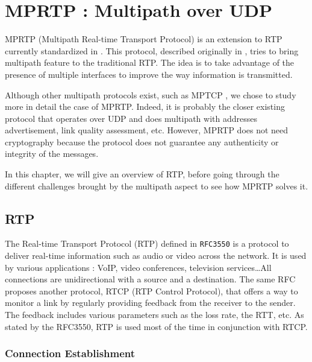 \chapter{MPRTP : Multipath over UDP}
\label{chap:mprtp}

MPRTP (Multipath Real-time Transport Protocol) is an extension to RTP currently standardized in \cite{singh-avtcore-mprtp}. This protocol, described originally in \cite{singh2013mprtp}, tries to bring multipath feature to the traditional RTP. The idea is to take advantage of the presence of multiple interfaces to improve the way information is transmitted.

Although other multipath protocols exist, such as MPTCP \cite{RFC6824}, we chose to study more in detail the case of MPRTP. Indeed, it is probably the closer existing protocol that operates over UDP and does multipath with addresses advertisement, link quality assessment, etc. However, MPRTP does not need cryptography because the protocol does not guarantee any authenticity or integrity of the messages.

In this chapter, we will give an overview of RTP, before going through the different challenges brought by the multipath aspect to see how MPRTP solves it.

\section{RTP}

The Real-time Transport Protocol (RTP) defined in \texttt{RFC3550} \cite{RFC3550} is a protocol to deliver real-time information such as audio or video across the network.  It is used by various applications : VoIP, video conferences, television services\dots All connections are unidirectional with a source and a destination. The same RFC proposes another protocol, RTCP (RTP Control Protocol), that offers a way to monitor a link by regularly providing feedback from the receiver to the sender. The feedback includes various parameters such as the loss rate, the RTT, etc. As stated by the RFC3550, RTP is used most of the time in conjunction with RTCP.

\subsection{Connection Establishment}

